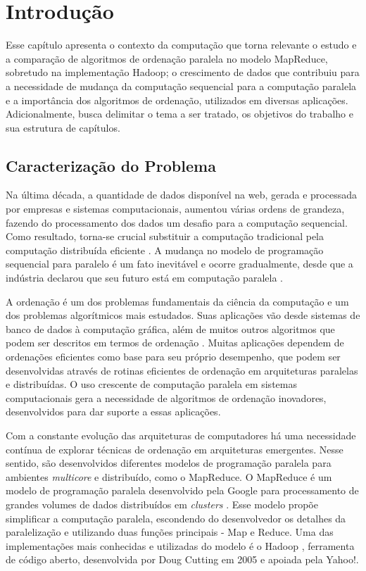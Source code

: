 %
%

\chapter{Introdução}\label{chap:introducao}

Esse capítulo apresenta o contexto da computação que torna relevante o estudo e a comparação de algoritmos de ordenação paralela no modelo MapReduce, sobretudo na implementação Hadoop; o crescimento de dados que contribuiu para a necessidade de mudança da computação sequencial para a computação paralela e a importância dos algoritmos de ordenação, utilizados em diversas aplicações. Adicionalmente, busca delimitar o tema a ser tratado, os objetivos do trabalho e sua estrutura de capítulos.  


\section{Caracterização do Problema}
\label{sec:caracProblema}

Na última década, a quantidade de dados  disponível na web, gerada e processada por empresas e sistemas computacionais, aumentou várias ordens de grandeza, fazendo do processamento dos dados um desafio para a computação sequencial. Como resultado, torna-se crucial substituir a computação tradicional pela computação distribuída eficiente \cite{Lin:2010}. A mudança no modelo de programação sequencial para paralelo é um fato inevitável e ocorre gradualmente, desde que a indústria declarou que seu futuro está em computação paralela \cite{Asanovic:2009}.

A ordenação é um dos problemas fundamentais da ciência da computação e um dos problemas algorítmicos mais estudados. Suas aplicações vão desde sistemas de banco de dados à computação gráfica, além de muitos outros algoritmos que podem ser descritos em termos de ordenação \cite{Satish:2009,Amato:1996}.  Muitas aplicações dependem de ordenações eficientes como base para seu próprio desempenho, que podem ser desenvolvidas através de rotinas eficientes de ordenação em arquiteturas paralelas e distribuídas. 
O uso crescente de computação paralela em sistemas computacionais gera a necessidade de algoritmos de ordenação inovadores, desenvolvidos para dar suporte a essas aplicações. 
 

Com a constante evolução das arquiteturas de computadores há uma necessidade contínua de explorar técnicas de ordenação em arquiteturas emergentes. 
Nesse sentido, são desenvolvidos diferentes modelos de programação paralela para ambientes \textit{multicore} e distribuído, como o MapReduce. O MapReduce é um modelo de programação paralela desenvolvido pela Google para processamento de grandes volumes de dados distribuídos em \textit{clusters} \cite{Dean:2008}. Esse modelo propõe simplificar a computação paralela, escondendo  do desenvolvedor os detalhes da paralelização e utilizando duas funções principais - Map e Reduce.
Uma das implementações mais conhecidas e utilizadas do modelo é o Hadoop \cite{White:2009}, ferramenta de código aberto, desenvolvida por Doug Cutting em 2005 e apoiada pela Yahoo!. 



